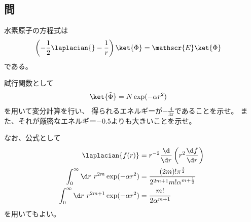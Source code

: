 \subsection{問}
水素原子の\Schrodinger 方程式は
\begin{align}
	\left(
		-
		\frac{1}{2} \laplacian{}
		-
		\frac{1}{r}
	\right) \ket{\Phi}
&=
	\mathscr{E} \ket{\Phi}
\end{align}
である。

試行関数として
\begin{align}
	\ket{\tilde{\Phi}}
&=
	N \exp(-\alpha r^2)
\end{align}
を用いて変分計算を行い、
得られるエネルギーが$-\frac{4}{3\pi}$であることを示せ。
また、それが厳密なエネルギー$-0.5$よりも大きいことを示せ。

なお、公式として
\begin{align}
	\laplacian{f(r)}
&=
	r^{-2}
		\frac{\d}{\d r}\left(
			r^2 \frac{\d f}{\d r}
		\right) \\
%
%
	\int_0^{\infty} \d r\
		r^{2m} \exp(-\alpha r^2)
&=
	\frac{
		(2m)! \pi^{\frac{1}{2}}
	}{
		2^{2m+1} m! \alpha^{m+\frac{1}{2}}
	} \\
%
%
	\int_0^{\infty} \d r\
		r^{2m+1} \exp(-\alpha r^2)
&=
	\frac{m!}{2\alpha^{m+1}}
\end{align}
を用いてもよい。


